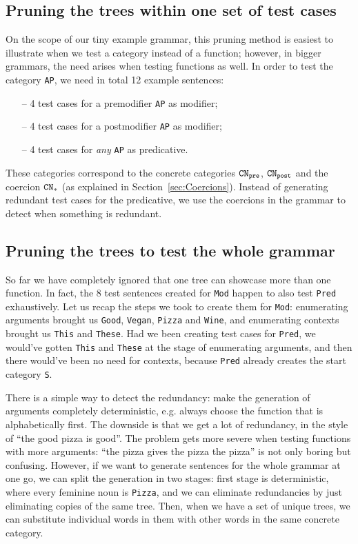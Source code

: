 \documentclass[11pt]{article}
\def\t#1{\texttt{#1}}
\newcommand{\kind}[1]{${\tt CN_{#1}}$}
\begin{document}
\subsection{Pruning the trees within one set of test cases} 
On the scope of our tiny example grammar, this pruning method is
easiest to illustrate when we test a category instead of a function;
however, in bigger grammars, the need arises when testing functions as
well. 
In order to test the category \t{AP}, we need in total 12 example sentences:
\begin{itemize}
\setlength\itemsep{0em}
\item[--] 4 test cases for a premodifier \t{AP} as modifier;
\item[--] 4 test cases for a postmodifier \t{AP} as modifier;
\item[--] 4 test cases for \emph{any} \t{AP} as predicative.
\end{itemize}
These categories correspond to the concrete categories \kind{pre},
\kind{post} and the coercion \kind{*} (as explained in
Section~\ref{sec:Coercions}). Instead of generating redundant test
cases for the predicative, we use the coercions in the grammar to
detect when something is redundant.

\subsection{Pruning the trees to test the whole grammar}
\label{sec:pruning_all}
So far we have completely ignored that one tree can showcase more
than one function. In fact, the 8 test sentences created for \t{Mod}
happen to also test \t{Pred} exhaustively.
Let us recap the steps we took to create them for \t{Mod}:
enumerating arguments brought us \t{Good}, \t{Vegan}, \t{Pizza} and
\t{Wine}, and enumerating contexts brought us \t{This} and
\t{These}. Had we been creating test cases for \t{Pred}, we would've
gotten \t{This} and \t{These} at the stage of enumerating arguments,
and then there would've been no need for contexts, because \t{Pred}
already creates the start category \t{S}.

There is a simple way to detect the redundancy: make the generation of
arguments completely deterministic, e.g. always choose the function
that is alphabetically first. The downside is that we get a lot of
redundancy, in the style of ``the good pizza is good''. The problem
gets more severe when testing functions with more arguments: ``the
pizza gives the pizza the pizza'' is not only boring but confusing.
However, if we want to generate sentences for the whole grammar at one 
go, we can split the generation in two stages: first stage is
deterministic, where every feminine noun is \t{Pizza}, and we can 
eliminate redundancies by just eliminating copies of the same
tree. Then, when we have a set of unique trees, we can substitute
individual words in them with other words in the same concrete
category.
\end{document}
